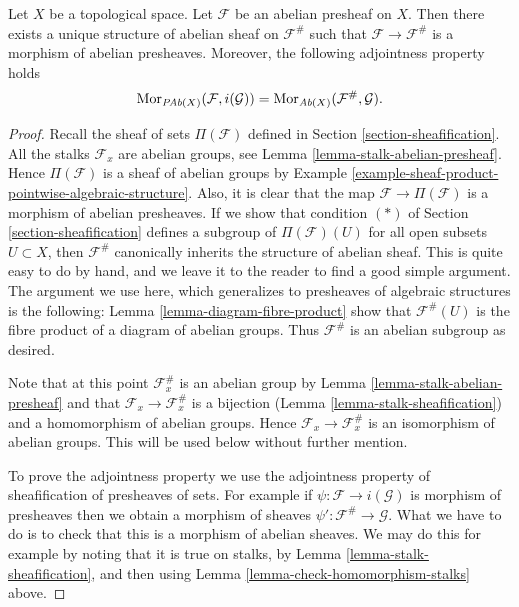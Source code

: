\begin{lemma}
\label{lemma-sheafify-abelian-presheaf}
Let $X$ be a topological space.
Let $\mathcal{F}$ be an abelian presheaf on $X$.
Then there exists a unique structure of
abelian sheaf on $\mathcal{F}^\#$ such that
$\mathcal{F} \to \mathcal{F}^\#$ is a morphism
of abelian presheaves. Moreover, the following adjointness
property holds
$$
\mathop{\mathrm{Mor}}\nolimits_{\textit{PAb}(X)}(\mathcal{F}, i(\mathcal{G}))
=
\mathop{\mathrm{Mor}}\nolimits_{\textit{Ab}(X)}(\mathcal{F}^\#, \mathcal{G}).
$$
\end{lemma}

\begin{proof}
Recall the sheaf of sets $\Pi(\mathcal{F})$ defined in
Section \ref{section-sheafification}. All the stalks
$\mathcal{F}_x$ are abelian groups, see
Lemma \ref{lemma-stalk-abelian-presheaf}.
Hence $\Pi(\mathcal{F})$ is a sheaf of abelian groups by
Example \ref{example-sheaf-product-pointwise-algebraic-structure}.
Also, it is clear that the map $\mathcal{F} \to \Pi(\mathcal{F})$
is a morphism of abelian presheaves. If we show that
condition $(*)$ of Section \ref{section-sheafification} defines a subgroup
of $\Pi(\mathcal{F})(U)$ for all open subsets $U \subset X$,
then $\mathcal{F}^\#$ canonically inherits the structure of abelian sheaf.
This is quite easy to do by hand, and we leave it to the
reader to find a good simple argument. The argument we use here,
which generalizes to presheaves of algebraic structures is the following:
Lemma \ref{lemma-diagram-fibre-product} show that
$\mathcal{F}^\#(U)$ is the fibre product of a diagram
of abelian groups. Thus $\mathcal{F}^\#$ is an abelian
subgroup as desired.

\medskip\noindent
Note that at this point $\mathcal{F}^\#_x$ is an abelian
group by Lemma \ref{lemma-stalk-abelian-presheaf}
and that $\mathcal{F}_x \to \mathcal{F}^\#_x$ is a
bijection (Lemma \ref{lemma-stalk-sheafification})
and a homomorphism of abelian groups. Hence
$\mathcal{F}_x \to \mathcal{F}^\#_x$ is an isomorphism
of abelian groups. This will be used below without further mention.

\medskip\noindent
To prove the adjointness property we use the adjointness
property of sheafification of presheaves of sets. For example
if $\psi : \mathcal{F} \to i(\mathcal{G})$ is morphism of presheaves
then we obtain a morphism of sheaves
$\psi' : \mathcal{F}^\# \to \mathcal{G}$. What we have to do is to check
that this is a morphism of abelian sheaves. We may do this
for example by noting that it is true on stalks,
by Lemma \ref{lemma-stalk-sheafification}, and then using
Lemma \ref{lemma-check-homomorphism-stalks} above.
\end{proof}



